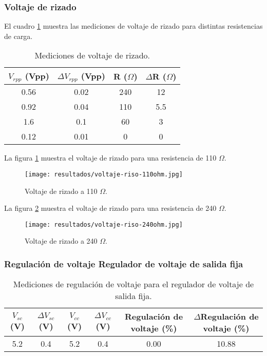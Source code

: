 \subsubsection{Voltaje de rizado}

El cuadro \ref{tab:mediciones-voltaje-rizado} muestra las mediciones de voltaje de rizado para distintas resistencias de carga.

\begin{table}[h!]
    \centering
    \begin{tabular}{|c|c|c|c|}
        \hline
        $V_{rpp}$ (Vpp) & $\Delta V_{rpp}$ (Vpp) & R ($\Omega$) & $\Delta$R ($\Omega$) \\
        \hline
        0.56 & 0.02 & 240 & 12 \\
        0.92 & 0.04 & 110 & 5.5 \\
        1.6 & 0.1 & 60 & 3 \\
        0.12 & 0.01 & 0 & 0 \\
        \hline
    \end{tabular}
    \caption{Mediciones de voltaje de rizado.}
    \label{tab:mediciones-voltaje-rizado}
\end{table}

La figura \ref{fig:voltaje-rizado-110ohm} muestra el voltaje de rizado para una resistencia de 110 $\Omega$.

\begin{figure}[ht]
    \centering
    \texttt{[image: resultados/voltaje-riso-110ohm.jpg]}
    \caption{Voltaje de rizado a 110 $\Omega$.}
    \label{fig:voltaje-rizado-110ohm}
\end{figure}

La figura \ref{fig:voltaje-rizado-240ohm} muestra el voltaje de rizado para una resistencia de 240 $\Omega$.

\begin{figure}[ht]
    \centering
    \texttt{[image: resultados/voltaje-riso-240ohm.jpg]}
    \caption{Voltaje de rizado a 240 $\Omega$.}
    \label{fig:voltaje-rizado-240ohm}
\end{figure}

\FloatBarrier
\subsubsection{Regulación de voltaje Regulador de voltaje de salida fija}

\begin{table}[h!]
    \centering
    \begin{tabular}{|c|c|c|c|c|c|}
        \hline
        $V_{sc}$ (V) & $\Delta V_{sc}$ (V) & $V_{cc}$ (V) & $\Delta V_{cc}$ (V) & Regulación de voltaje (\%) & $\Delta$Regulación de voltaje (\%) \\
        \hline
        5.2 & 0.4 & 5.2 & 0.4 & 0.00 & 10.88 \\
        \hline
    \end{tabular}
    \caption{Mediciones de regulación de voltaje para el regulador de voltaje de salida fija.}
    \label{tab:mediciones-regulacion-voltaje-fija}
\end{table}

